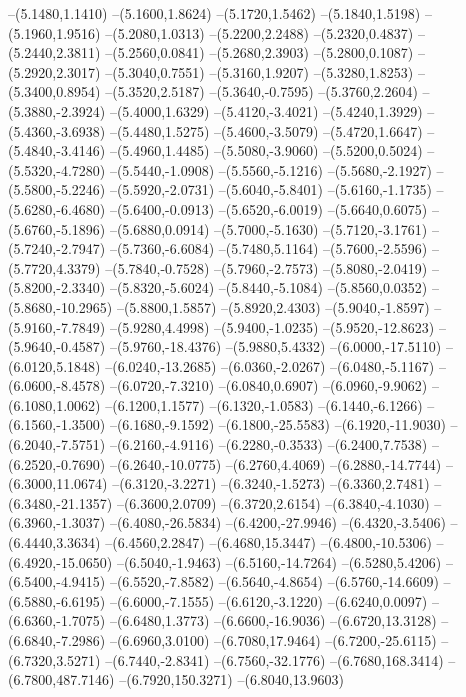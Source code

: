 {\begin{scope}
--(5.1480,1.1410)
--(5.1600,1.8624)
--(5.1720,1.5462)
--(5.1840,1.5198)
--(5.1960,1.9516)
--(5.2080,1.0313)
--(5.2200,2.2488)
--(5.2320,0.4837)
--(5.2440,2.3811)
--(5.2560,0.0841)
--(5.2680,2.3903)
--(5.2800,0.1087)
--(5.2920,2.3017)
--(5.3040,0.7551)
--(5.3160,1.9207)
--(5.3280,1.8253)
--(5.3400,0.8954)
--(5.3520,2.5187)
--(5.3640,-0.7595)
--(5.3760,2.2604)
--(5.3880,-2.3924)
--(5.4000,1.6329)
--(5.4120,-3.4021)
--(5.4240,1.3929)
--(5.4360,-3.6938)
--(5.4480,1.5275)
--(5.4600,-3.5079)
--(5.4720,1.6647)
--(5.4840,-3.4146)
--(5.4960,1.4485)
--(5.5080,-3.9060)
--(5.5200,0.5024)
--(5.5320,-4.7280)
--(5.5440,-1.0908)
--(5.5560,-5.1216)
--(5.5680,-2.1927)
--(5.5800,-5.2246)
--(5.5920,-2.0731)
--(5.6040,-5.8401)
--(5.6160,-1.1735)
--(5.6280,-6.4680)
--(5.6400,-0.0913)
--(5.6520,-6.0019)
--(5.6640,0.6075)
--(5.6760,-5.1896)
--(5.6880,0.0914)
--(5.7000,-5.1630)
--(5.7120,-3.1761)
--(5.7240,-2.7947)
--(5.7360,-6.6084)
--(5.7480,5.1164)
--(5.7600,-2.5596)
--(5.7720,4.3379)
--(5.7840,-0.7528)
--(5.7960,-2.7573)
--(5.8080,-2.0419)
--(5.8200,-2.3340)
--(5.8320,-5.6024)
--(5.8440,-5.1084)
--(5.8560,0.0352)
--(5.8680,-10.2965)
--(5.8800,1.5857)
--(5.8920,2.4303)
--(5.9040,-1.8597)
--(5.9160,-7.7849)
--(5.9280,4.4998)
--(5.9400,-1.0235)
--(5.9520,-12.8623)
--(5.9640,-0.4587)
--(5.9760,-18.4376)
--(5.9880,5.4332)
--(6.0000,-17.5110)
--(6.0120,5.1848)
--(6.0240,-13.2685)
--(6.0360,-2.0267)
--(6.0480,-5.1167)
--(6.0600,-8.4578)
--(6.0720,-7.3210)
--(6.0840,0.6907)
--(6.0960,-9.9062)
--(6.1080,1.0062)
--(6.1200,1.1577)
--(6.1320,-1.0583)
--(6.1440,-6.1266)
--(6.1560,-1.3500)
--(6.1680,-9.1592)
--(6.1800,-25.5583)
--(6.1920,-11.9030)
--(6.2040,-7.5751)
--(6.2160,-4.9116)
--(6.2280,-0.3533)
--(6.2400,7.7538)
--(6.2520,-0.7690)
--(6.2640,-10.0775)
--(6.2760,4.4069)
--(6.2880,-14.7744)
--(6.3000,11.0674)
--(6.3120,-3.2271)
--(6.3240,-1.5273)
--(6.3360,2.7481)
--(6.3480,-21.1357)
--(6.3600,2.0709)
--(6.3720,2.6154)
--(6.3840,-4.1030)
--(6.3960,-1.3037)
--(6.4080,-26.5834)
--(6.4200,-27.9946)
--(6.4320,-3.5406)
--(6.4440,3.3634)
--(6.4560,2.2847)
--(6.4680,15.3447)
--(6.4800,-10.5306)
--(6.4920,-15.0650)
--(6.5040,-1.9463)
--(6.5160,-14.7264)
--(6.5280,5.4206)
--(6.5400,-4.9415)
--(6.5520,-7.8582)
--(6.5640,-4.8654)
--(6.5760,-14.6609)
--(6.5880,-6.6195)
--(6.6000,-7.1555)
--(6.6120,-3.1220)
--(6.6240,0.0097)
--(6.6360,-1.7075)
--(6.6480,1.3773)
--(6.6600,-16.9036)
--(6.6720,13.3128)
--(6.6840,-7.2986)
--(6.6960,3.0100)
--(6.7080,17.9464)
--(6.7200,-25.6115)
--(6.7320,3.5271)
--(6.7440,-2.8341)
--(6.7560,-32.1776)
--(6.7680,168.3414)
--(6.7800,487.7146)
--(6.7920,150.3271)
--(6.8040,13.9603)

\end{scope}}
